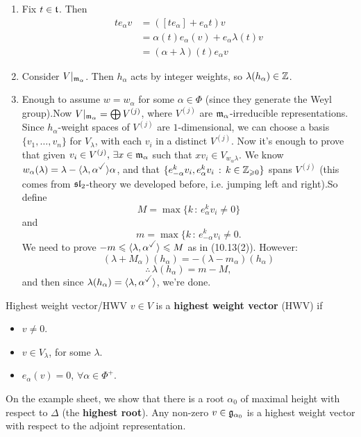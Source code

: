\documentclass{article}
\begin{document}
\proof \hspace{0.1cm} \begin{enumerate}
    \item Fix $t \in \mathfrak{t}$. Then 
        \begin{align*}
            te_{\alpha}v &= ([te_{\alpha}] + e_{\alpha}t)v\\
            &= \alpha(t)e_{\alpha}(v)+e_{\alpha}\lambda(t)v\\
            &= (\alpha + \lambda)(t)e_{\alpha}v
        \end{align*}
    \item Consider $V|_{\mathfrak{m}_{\alpha}}$. Then $h_{\alpha}$ acts by integer weights, so $\lambda(h_{\alpha}) \in \mathbb{Z}$.
    \item Enough to assume $w=w_{\alpha}$ for some $\alpha \in \Phi$ (since they generate the Weyl group).\gap Now $V|_{\mathfrak{m}_{\alpha}} = \bigoplus V^{(j)}$, where $V^{(j)}$ are $\mathfrak{m}_{\alpha}$-irreducible representations. Since $h_{\alpha}$-weight spaces of $V^{(j)}$ are $1$-dimensional, we can choose a basis $\{v_{1},\dots, v_{n}\}$ for $V_{\lambda}$, with each $v_{i}$ in a distinct $V^{(j)}$. \gap Now it's enough to prove that given $v_{i} \in V^{(j)}, \, \exists x \in \mathfrak{m}_{\alpha}$ such that $xv_{i} \in V_{w_{\alpha}\lambda}$. We know $w_{\alpha}(\lambda)=\lambda-\langle \lambda, \alpha^{\checked}\rangle \alpha$, and that $\{e_{-\alpha}^{k}v_{i}, e^{k}_{\alpha}v_{i} \, : \, k \in \mathbb{Z}_{\geqslant 0}\}$ spans $V^{(j)}$ (this comes from $\mathfrak{sl}_{2}$-theory we developed before, i.e. jumping left and right).\gap So define \[M = \max\{k \, : \, e^{k}_{\alpha}v_{i} \neq 0\}\] and \[m = \max \{k \, : \, e^{k}_{-\alpha}v_{i} \neq 0.\] \gap We need to prove $-m \leq \langle \lambda, \alpha^{\checked} \rangle \leq M$ as in (10.13(2)). However: \[ (\lambda + M_{\alpha})(h_{\alpha}) = -(\lambda-m_{\alpha})(h_{\alpha})\] \[\therefore\, \lambda(h_{\alpha}) = m-M,\] and then since $\lambda(h_{\alpha})=\langle \lambda, \alpha^{\checked}\rangle$, we're done.
\end{enumerate}
\endproof
\begin{fancydefine}{Highest weight vector/HWV}
    $v \in V$ is a \textbf{highest weight vector} (HWV) if \begin{itemize}
        \item $v \neq 0$.
        \item $v \in V_{\lambda}$, for some $\lambda$.
        \item $e_{\alpha}(v)=0$, $\forall \alpha \in \Phi^{+}$.
    \end{itemize}
    On the example sheet, we show that there is a root $\alpha_{0}$ of maximal height with respect to $\Delta$ (the \textbf{highest root}). Any non-zero $v \in \mathfrak{g}_{\alpha_{0}}$ is a highest weight vector with respect to the adjoint representation.
\end{fancydefine}
\end{document}
